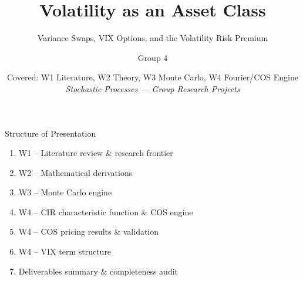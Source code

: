 \documentclass[aspectratio=169, 11pt]{beamer}
\title{Volatility as an Asset Class}
\subtitle{Variance Swaps, VIX Options, and the Volatility Risk Premium}
\author{Group 4}
\date{Covered: W1 Literature, W2 Theory, W3 Monte Carlo, W4 Fourier/COS Engine\\[4pt]
\textit{Stochastic Processes --- Group Research Projects}}
\begin{document}
\begin{frame}[plain]
  \titlepage
\end{frame}

\begin{frame}{Structure of Presentation}
  \begin{enumerate}
    \item W1 -- Literature review \& research frontier
    \item W2 -- Mathematical derivations
    \item W3 -- Monte Carlo engine
    \item W4 -- CIR characteristic function \& COS engine
    \item W4 -- COS pricing results \& validation
    \item W4 -- VIX term structure
    \item Deliverables summary \& completeness audit
  \end{enumerate}
\end{frame}
\end{document}
